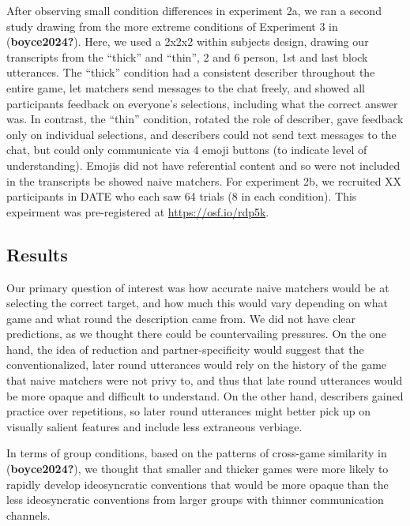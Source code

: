 \documentclass[10pt, letterpaper]{article}
\begin{document}
After observing small condition differences in experiment 2a, we ran a
second study drawing from the more extreme conditions of Experiment 3 in
(\textbf{boyce2024?}). Here, we used a 2x2x2 within subjects design,
drawing our transcripts from the ``thick'' and ``thin'', 2 and 6 person,
1st and last block utterances. The ``thick'' condition had a consistent
describer throughout the entire game, let matchers send messages to the
chat freely, and showed all participants feedback on everyone's
selections, including what the correct answer was. In contrast, the
``thin'' condition, rotated the role of describer, gave feedback only on
individual selections, and describers could not send text messages to
the chat, but could only communicate via 4 emoji buttons (to indicate
level of understanding). Emojis did not have referential content and so
were not included in the transcripts be showed naive matchers. For
experiment 2b, we recruited XX participants in DATE who each saw 64
trials (8 in each condition). This expeirment was pre-registered at
\url{https://osf.io/rdp5k}.

\subsection{Results}\label{results}

Our primary question of interest was how accurate naive matchers would
be at selecting the correct target, and how much this would vary
depending on what game and what round the description came from. We did
not have clear predictions, as we thought there could be countervailing
pressures. On the one hand, the idea of reduction and
partner-specificity would suggest that the conventionalized, later round
utterances would rely on the history of the game that naive matchers
were not privy to, and thus that late round utterances would be more
opaque and difficult to understand. On the other hand, describers gained
practice over repetitions, so later round utterances might better pick
up on visually salient features and include less extraneous verbiage.

In terms of group conditions, based on the patterns of cross-game
similarity in (\textbf{boyce2024?}), we thought that smaller and thicker
games were more likely to rapidly develop ideosyncratic conventions that
would be more opaque than the less ideosyncratic conventions from larger
groups with thinner communication channels.
\end{document}
